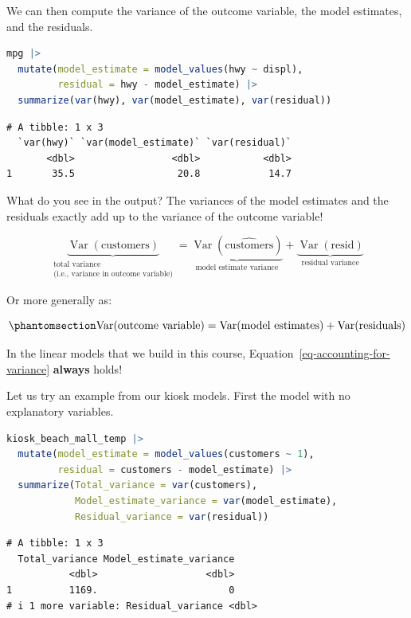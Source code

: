 \documentclass[
  12pt,
  letterpaper,
  DIV=11,
  numbers=noendperiod]{scrreprt}
\begin{document}
We can then compute the variance of the outcome variable, the model
estimates, and the residuals.

\begin{lstlisting}[language=R]
mpg |> 
  mutate(model_estimate = model_values(hwy ~ displ),
         residual = hwy - model_estimate) |> 
  summarize(var(hwy), var(model_estimate), var(residual))
\end{lstlisting}

\begin{lstlisting}
# A tibble: 1 x 3
  `var(hwy)` `var(model_estimate)` `var(residual)`
       <dbl>                 <dbl>           <dbl>
1       35.5                  20.8            14.7
\end{lstlisting}

What do you see in the output? The variances of the model estimates and
the residuals exactly add up to the variance of the outcome variable!

\[
\underbrace{\operatorname{Var}(\text{customers})}_{\substack{
    \text{total variance} \\
    \text{(i.e., variance in outcome variable)}
  }}
= \underbrace{\operatorname{Var}(\widehat{\text{customers}})}_{\text{model estimate variance}}
+ \underbrace{\operatorname{Var}(\text{resid})}_{\text{residual variance}}
\]

Or more generally as:

\begin{equation}\phantomsection\label{eq-accounting-for-variance}{
\operatorname{Var}(\text{outcome variable}) 
= \operatorname{Var}(\text{model estimates}) 
+ \operatorname{Var}(\text{residuals})
}\end{equation}

In the linear models that we build in this course,
Equation~\ref{eq-accounting-for-variance} \textbf{always} holds!

Let us try an example from our kiosk models. First the model with no
explanatory variables.

\begin{lstlisting}[language=R]
kiosk_beach_mall_temp |> 
  mutate(model_estimate = model_values(customers ~ 1),
         residual = customers - model_estimate) |> 
  summarize(Total_variance = var(customers), 
            Model_estimate_variance = var(model_estimate), 
            Residual_variance = var(residual))
\end{lstlisting}

\begin{lstlisting}
# A tibble: 1 x 3
  Total_variance Model_estimate_variance
           <dbl>                   <dbl>
1          1169.                       0
# i 1 more variable: Residual_variance <dbl>
\end{lstlisting}
\end{document}
